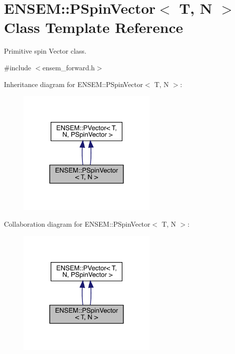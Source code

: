 \hypertarget{classENSEM_1_1PSpinVector}{}\section{E\+N\+S\+EM\+:\+:P\+Spin\+Vector$<$ T, N $>$ Class Template Reference}
\label{classENSEM_1_1PSpinVector}


Primitive spin Vector class.  




{\ttfamily \#include $<$ensem\+\_\+forward.\+h$>$}



Inheritance diagram for E\+N\+S\+EM\+:\+:P\+Spin\+Vector$<$ T, N $>$\+:\nopagebreak
\begin{figure}[H]
\begin{center}
\leavevmode
\includegraphics[width=192pt]{d1/dec/classENSEM_1_1PSpinVector__inherit__graph}
\end{center}
\end{figure}


Collaboration diagram for E\+N\+S\+EM\+:\+:P\+Spin\+Vector$<$ T, N $>$\+:\nopagebreak
\begin{figure}[H]
\begin{center}
\leavevmode
\includegraphics[width=192pt]{db/da2/classENSEM_1_1PSpinVector__coll__graph}
\end{center}
\end{figure}
